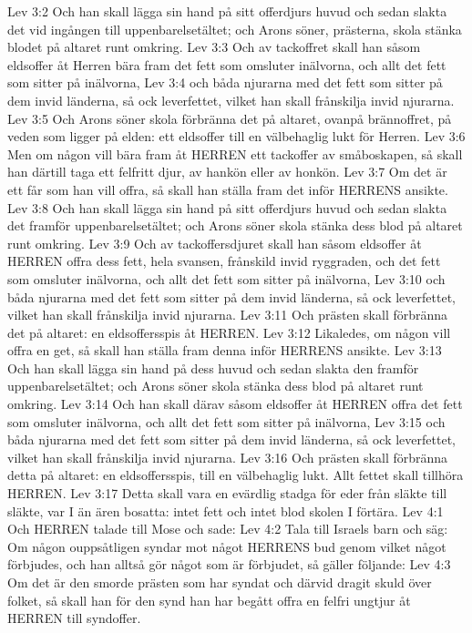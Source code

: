Lev 3:2  Och han skall lägga sin hand på sitt offerdjurs huvud och sedan slakta det vid ingången till uppenbarelsetältet; och Arons söner, prästerna, skola stänka blodet på altaret runt omkring.
Lev 3:3  Och av tackoffret skall han såsom eldsoffer åt Herren bära fram det fett som omsluter inälvorna, och allt det fett som sitter på inälvorna,
Lev 3:4  och båda njurarna med det fett som sitter på dem invid länderna, så ock leverfettet, vilket han skall frånskilja invid njurarna.
Lev 3:5  Och Arons söner skola förbränna det på altaret, ovanpå brännoffret, på veden som ligger på elden: ett eldsoffer till en välbehaglig lukt för Herren.
Lev 3:6  Men om någon vill bära fram åt HERREN ett tackoffer av småboskapen, så skall han därtill taga ett felfritt djur, av hankön eller av honkön.
Lev 3:7  Om det är ett får som han vill offra, så skall han ställa fram det inför HERRENS ansikte.
Lev 3:8  Och han skall lägga sin hand på sitt offerdjurs huvud och sedan slakta det framför uppenbarelsetältet; och Arons söner skola stänka dess blod på altaret runt omkring.
Lev 3:9  Och av tackoffersdjuret skall han såsom eldsoffer åt HERREN offra dess fett, hela svansen, frånskild invid ryggraden, och det fett som omsluter inälvorna, och allt det fett som sitter på inälvorna,
Lev 3:10  och båda njurarna med det fett som sitter på dem invid länderna, så ock leverfettet, vilket han skall frånskilja invid njurarna.
Lev 3:11  Och prästen skall förbränna det på altaret: en eldsoffersspis åt HERREN.
Lev 3:12  Likaledes, om någon vill offra en get, så skall han ställa fram denna inför HERRENS ansikte.
Lev 3:13  Och han skall lägga sin hand på dess huvud och sedan slakta den framför uppenbarelsetältet; och Arons söner skola stänka dess blod på altaret runt omkring.
Lev 3:14  Och han skall därav såsom eldsoffer åt HERREN offra det fett som omsluter inälvorna, och allt det fett som sitter på inälvorna,
Lev 3:15  och båda njurarna med det fett som sitter på dem invid länderna, så ock leverfettet, vilket han skall frånskilja invid njurarna.
Lev 3:16  Och prästen skall förbränna detta på altaret: en eldsoffersspis, till en välbehaglig lukt. Allt fettet skall tillhöra HERREN.
Lev 3:17  Detta skall vara en evärdlig stadga för eder från släkte till släkte, var I än ären bosatta: intet fett och intet blod skolen I förtära.
Lev 4:1  Och HERREN talade till Mose och sade:
Lev 4:2  Tala till Israels barn och säg: Om någon ouppsåtligen syndar mot något HERRENS bud genom vilket något förbjudes, och han alltså gör något som är förbjudet, så gäller följande:
Lev 4:3  Om det är den smorde prästen som har syndat och därvid dragit skuld över folket, så skall han för den synd han har begått offra en felfri ungtjur åt HERREN till syndoffer.
